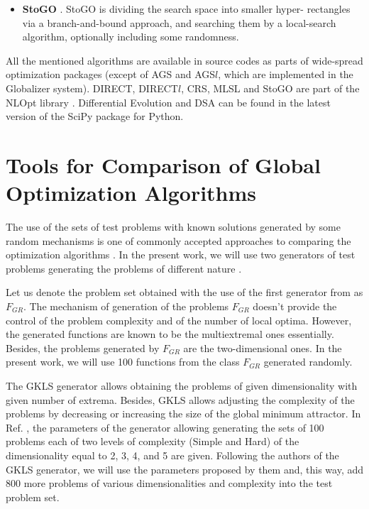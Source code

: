 \documentclass{svproc}
\begin{document}
\begin{itemize}
  \item \textbf{StoGO} \cite{Madsen1998}. StoGO is dividing the search space into smaller hyper-
rectangles via a branch-and-bound approach,
  and searching them by a local-search algorithm, optionally including some randomness.

\end{itemize}

All the mentioned algorithms are available in source codes as parts of wide-spread optimization packages (except of AGS and AGS\(l\), which are implemented in the Globalizer system).
DIRECT, DIRECT$l$, CRS, MLSL and StoGO are part of the NLOpt library \cite{nlopt}.
Differential Evolution and DSA can be found in
the latest version of the SciPy \cite{scipy} package for Python.

\section{Tools for Comparison of Global Optimization Algorithms}


The use of the sets of test problems with known solutions generated by some random mechanisms is
one of commonly accepted approaches to comparing the optimization algorithms
\cite{Beiranvand2017}. In the present work, we will use two generators of test problems generating
the problems of different nature \cite{grishaginClass, Gaviano2003}.

Let us denote the problem set obtained with the use of the first generator from \cite{grishaginClass}
as \(F_{GR}\). The mechanism of generation of the problems \(F_{GR}\) doesn't provide the
control of the problem complexity and of the number of local optima. However, the generated
functions are known to be the multiextremal ones essentially. Besides, the problems generated by
\(F_{GR}\) are the two-dimensional ones. In the present work, we will use 100 functions from the
class \(F_{GR}\) generated randomly.

The GKLS generator \cite{Gaviano2003} allows obtaining the problems of given dimensionality
with given number of extrema. Besides, GKLS allows adjusting the complexity of the problems by
decreasing or increasing the size of the global minimum attractor. In Ref.
\cite{SergeyevKvasov2006}, the parameters of the generator allowing generating the sets of 100
problems each of two levels of complexity (Simple and Hard) of the dimensionality equal to 2, 3, 4,
and 5 are given. Following the authors of the GKLS generator, we will use the parameters proposed
by them and, this way, add 800 more problems of various dimensionalities and complexity into the
test problem set.
\end{document}
